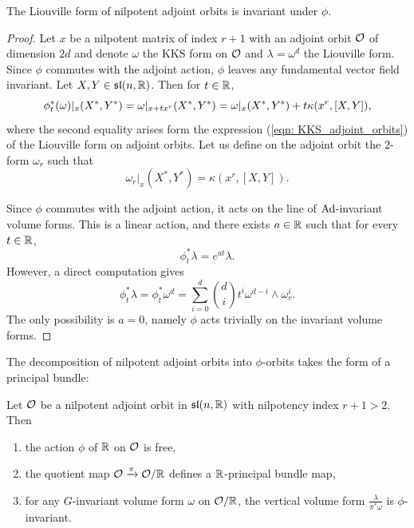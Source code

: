 \documentclass[english]{article}
\begin{document}
\begin{proposition}\label{propno:LiouvillePhiInvariant}
    The Liouville form of nilpotent adjoint orbits is invariant under $\phi$.
\end{proposition}  
%
\begin{proof}
    Let $x$ be a nilpotent matrix of index $r+1$ with an adjoint orbit $\mathcal{O}$ of dimension $2d$ and denote $\omega$ the KKS form on $\mathcal{O}$ and $\lambda=\omega^d$ the Liouville form.
    Since $\phi$ commutes with the adjoint action, $\phi$ leaves any fundamental vector field invariant. Let $X, Y \in \mathfrak{sl}(n, \mathbb{R})$. Then for $t\in \mathbb{R}$,
    \[
        \phi_t^*(\omega)|_x(X^*,Y^*)
            = \omega|_{x+t x^r}(X^*, Y^*)
            = \omega|_x(X^*, Y^*) + t\kappa(x^r, [X,Y])
    ,\]
    where the second equality arises form the expression (\ref{eqn: KKS_adjoint_orbits}) of the Liouville form on adjoint orbits.
    Let us define on the adjoint orbit the $2$-form $\omega_r$ such that
    \[
        \omega_r|_x(X^*, Y^*) = \kappa(x^r, [X,Y])
    .\]

    Since $\phi$ commutes with the adjoint action, it acts on the line of $\operatorname{Ad}$-invariant volume forms. This is a linear action, and there exists $a\in \mathbb{R}$ such that for every $t\in \mathbb{R}$, 
    \[
        \phi_t^*\lambda = e^{at} \lambda
    .\]
    However, a direct computation gives
    \[
        \phi_t^* \lambda
        = \phi_t^*\omega^{d}
        = \sum_{i=0}^d \binom{d}{i} t^i \omega^{d-i} \wedge \omega_r^i
    .\]
    The only possibility is $a=0$, namely $\phi$ acts trivially on the invariant volume forms.
\end{proof}

The decomposition of nilpotent adjoint orbits into $\phi$-orbits takes the form of a principal bundle:
\begin{proposition}
    Let $\mathcal{O}$ be a nilpotent adjoint orbit in $\mathfrak{sl}(n, \mathbb{R})$ with nilpotency index $r+1 > 2$. Then
    \begin{enumerate}
        \item the action $\phi$ of $\mathbb{R}$ on $\mathcal{O}$ is free, 
        \item the quotient map $\mathcal{O} \xrightarrow{\pi} \mathcal{O} / \mathbb{R}$ defines a $\mathbb{R}$-principal bundle map,
        \item for any $G$-invariant volume form $\omega$ on $\mathcal{O}/\mathbb{R}$, the vertical volume form $\frac{\lambda}{\pi^*\omega}$ is $\phi$-invariant.
    \end{enumerate}
\end{proposition}
\end{document}
